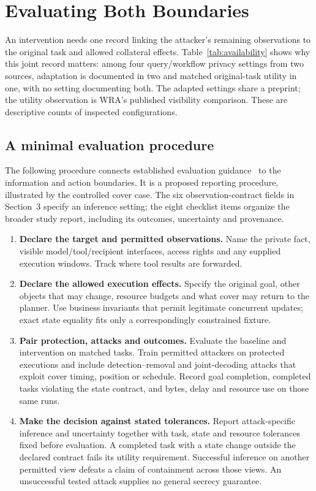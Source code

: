 \section{Evaluating Both Boundaries}\label{sec:reporting}
An intervention needs one record linking the attacker's remaining observations to the original task and allowed collateral effects. Table~\ref{tab:availability} shows why this joint record matters: among four query/workflow privacy settings from two sources, adaptation is documented in two and matched original-task utility in one, with no setting documenting both. The adapted settings share a preprint; the utility observation is WRA's published visibility comparison. These are descriptive counts of inspected configurations.




\subsection{A minimal evaluation procedure}
The following procedure connects established evaluation guidance~\cite{arp2022dos,juarez2014critical,mathews2023critical} to the information and action boundaries. It is a proposed reporting procedure, illustrated by the controlled cover case. The six observation-contract fields in Section~3 specify an inference setting; the eight checklist items organize the broader study report, including its outcomes, uncertainty and provenance.

\begin{enumerate}
\item \textbf{Declare the target and permitted observations.} Name the private fact, visible model/tool/recipient interfaces, access rights and any supplied execution windows. Track where tool results are forwarded.
\item \textbf{Declare the allowed execution effects.} Specify the original goal, other objects that may change, resource budgets and what cover may return to the planner. Use business invariants that permit legitimate concurrent updates; exact state equality fits only a correspondingly constrained fixture.
\item \textbf{Pair protection, attacks and outcomes.} Evaluate the baseline and intervention on matched tasks. Train permitted attackers on protected executions and include detection--removal and joint-decoding attacks that exploit cover timing, position or schedule. Record goal completion, completed tasks violating the state contract, and bytes, delay and resource use on those same runs.
\item \textbf{Make the decision against stated tolerances.} Report attack-specific inference and uncertainty together with task, state and resource tolerances fixed before evaluation. A completed task with a state change outside the declared contract fails its utility requirement. Successful inference on another permitted view defeats a claim of containment across those views. An unsuccessful tested attack supplies no general secrecy guarantee.
\end{enumerate}

